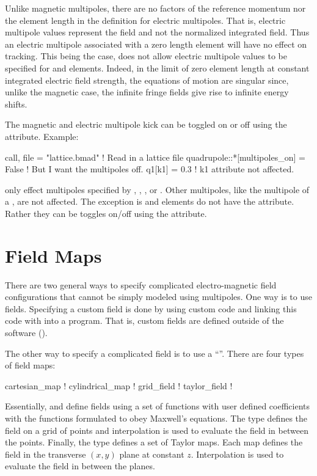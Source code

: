 Unlike magnetic multipoles, there are no factors of the reference momentum nor the element length in
the definition for electric multipoles. That is, electric multipole values represent the field and
not the normalized integrated field. Thus an electric multipole associated with a zero length
element will have no effect on tracking. This being the case, \bmad does not allow electric
multipole values to be specified for  and  elements. Indeed, in the
limit of zero element length at constant integrated electric field strength, the equations of motion
are singular since, unlike the magnetic case, the infinite fringe fields give rise to infinite
energy shifts.

The magnetic and electric multipole kick can be toggled on or off using the
 attribute. Example:
\begin{example}
  call, file = "lattice.bmad"             ! Read in a lattice file
  quadrupole::*[multipoles_on] = False    ! But I want the multipoles off.
  q1[k1] = 0.3                            ! k1 attribute not affected.
\end{example}
 only effect multipoles specified by , , , or
. Other multipoles, like the  multipole of a , are not
affected. The exception is  and  elements do not have the
 attribute. Rather they can be toggles on/off using the 
attribute.

\section{Field Maps}
\label{s:fieldmap}

There are two general ways to specify complicated electro-magnetic field configurations
that cannot be simply modeled using multipoles. One way is to use 
fields. Specifying a custom field is done by using custom code and linking this code with
\bmad into a program. That is, custom fields are defined outside of the \bmad software
().

The other way to specify a complicated field is to use a ``''. There
are four types of field maps:
\begin{example}
  cartesian_map       ! 
  cylindrical_map     ! 
  grid_field          ! 
  taylor_field        ! 
\end{example}
Essentially,  and  define fields using a set of
functions with user defined coefficients with the functions formulated to obey Maxwell's
equations. The  type defines the field on a grid of points and
interpolation is used to evaluate the field in between the points. Finally, the
 type defines a set of Taylor maps. Each map defines the field in the
transverse $(x, y)$ plane at constant $z$. Interpolation is used to evaluate the field
in between the planes.


